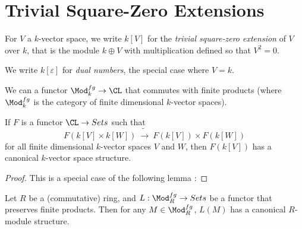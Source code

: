 \section{Trivial Square-Zero Extensions}
\label{subsubsec:tsze}

\begin{definition}
  \label{def:tsze_C}
  \leanok
  For $V$ a $k$-vector space, we write $k[V]$ for the
  \emph{trivial square-zero extension}
  of $V$ over $k$, that is the module $k \oplus V$ with
  multiplication defined so that $V ^ 2 = 0$.
\end{definition}

\begin{definition}
  \label{def:dualnumber_C}
  \leanok
  We write $k[\varepsilon]$ for \emph{dual numbers}, the special case
  where $V = k$.
\end{definition}

\begin{definition}
  \label{def:tsze_functor}
  \leanok
  We can a functor $\Mod_k^{fg} \to \CL$
  that commutes with finite products (where $\Mod_k^{fg}$ is the category
  of finite dimensional $k$-vector spaces).
\end{definition}

\begin{lemma}
  \label{lem:vstsze}
  \leanok
  If $F$ is a functor $\CL \to Sets$ such that
  \[ F(k[V] \times k[W]) ~ \tilde{\to} ~ F(k[V]) \times F(k[W]) \]
  for all finite dimensional $k$-vector spaces $V$ and $W$, then
  $F(k[V])$ has a canonical $k$-vector space structure.
\end{lemma}

\begin{proof}
  \leanok
  This is a special case of the following lemma
  \cite[\href{https://stacks.math.columbia.edu/tag/06I6}{Tag 06I6}]{stacks-project}:
\end{proof}

\begin{lemma}
  \label{lem:vs}
  \leanok
  Let $R$ be a (commutative) ring, and $L : \Mod_R^{fg} \to Sets$ be a functor
  that preserves finite products.
  Then for any $M \in \Mod_R^{fg}$, $L(M)$ has a canonical $R$-module
  structure.
\end{lemma}

